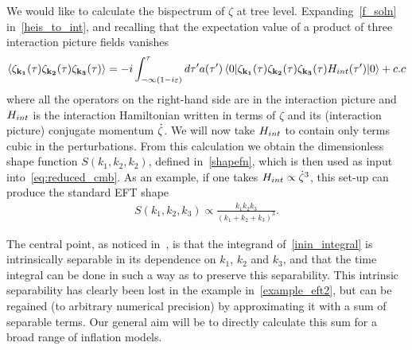 We would like to calculate the bispectrum of $\zeta$ at tree level.
Expanding~\eqref{f_soln} in~\eqref{heis_to_int}, and recalling that
the expectation value of a product of three interaction picture fields vanishes
\begin{align}\label{inin_integral}
{
    \left< \zeta_{\mathbf{k_1}}(\tau)\zeta_{\mathbf{k_2}}(\tau)\zeta_{\mathbf{k_3}}(\tau) \right>
=-i\int_{-\infty(1-i\varepsilon)}^{\tau}d\tau'a(\tau')
    \left<0\lvert \zeta_{\mathbf{k_1}}(\tau)\zeta_{\mathbf{k_2}}(\tau)\zeta_{\mathbf{k_3}}(\tau)H_{int}(\tau') \rvert0\right>+c.c
}
\end{align}
where all the operators on the right-hand side are in the interaction picture
and $H_{int}$ is the interaction Hamiltonian written in terms of $\zeta$ and its
(interaction picture) conjugate momentum $\dot{\zeta}$.
We will now take $H_{int}$ to contain only terms cubic in the perturbations.
From this calculation we obtain the dimensionless shape function $S(k_1,k_2,k_2)$,
defined in~\eqref{shapefn},
which is then used as input into~\eqref{eq:reduced_cmb}.
As an example, if one takes $H_{int}\propto\dot{\zeta}^3$, this set-up can produce the standard EFT shape
\begin{align}\label{example_eft2}
    S(k_1, k_2, k_3) \propto \frac{k_1k_2k_3}{(k_1+k_2+k_3)^3}.
\end{align}

The central point, as noticed in~\cite{Funakoshi}, is that the
integrand of~\eqref{inin_integral} is intrinsically separable
in its dependence on $k_1$, $k_2$ and $k_3$, and that the time integral
can be done in such a way as to preserve this separability.
This intrinsic separability has clearly been lost in
the example in~\eqref{example_eft2},
but can be regained (to arbitrary numerical precision) by approximating it
with a sum of separable terms. Our general aim will be to directly calculate
this sum for a broad range of inflation models.




